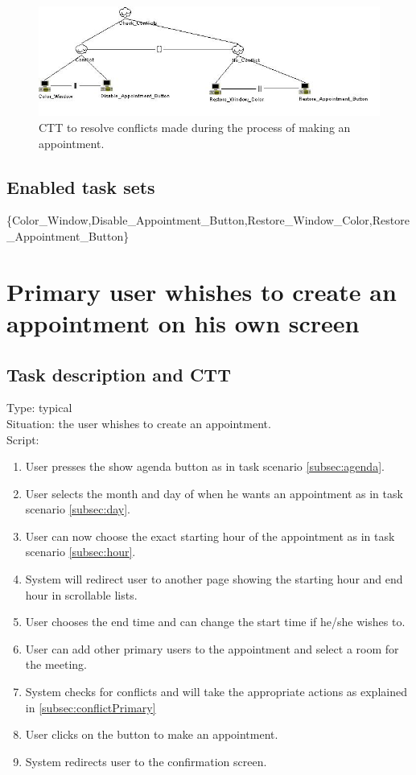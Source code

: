 \documentclass[11pt, a4paper,svglistings]{report}
\begin{document}
\begin{figure}[H]
\centering
    \includegraphics[width=1\textwidth]{CTTxml/Conflict.jpg}
  \caption[Conflicting appointment]{\label{fig:ConflictingAppointment}CTT to resolve conflicts made during the process of making an appointment.}
\end{figure}

\subsection{Enabled task sets}

\{Color\_Window,Disable\_Appointment\_Button,Restore\_Window\_Color,Restore\_Appointment\_Button\}


\section{Primary user whishes to create an appointment on his own screen}

\subsection{Task description and CTT}

Type: typical \\
Situation: the user whishes to create an appointment. \\
Script:
\begin{enumerate}
\item User presses the show agenda button as in task scenario \ref{subsec:agenda}.
\item User selects the month and day of when he wants an appointment as in task scenario \ref{subsec:day}.
\item User can now choose the exact starting hour of the appointment as in task scenario \ref{subsec:hour}.
\item System will redirect user to another page showing the starting hour and end hour in scrollable lists.
\item User chooses the end time and can change the start time if he/she wishes to.
\item User can add other primary users to the appointment and select a room for the meeting.
\item System checks for conflicts and will take the appropriate actions as explained in \ref{subsec:conflictPrimary}
\item User clicks on the button to make an appointment.
\item System redirects user to the confirmation screen.
\end{enumerate}
\end{document}

